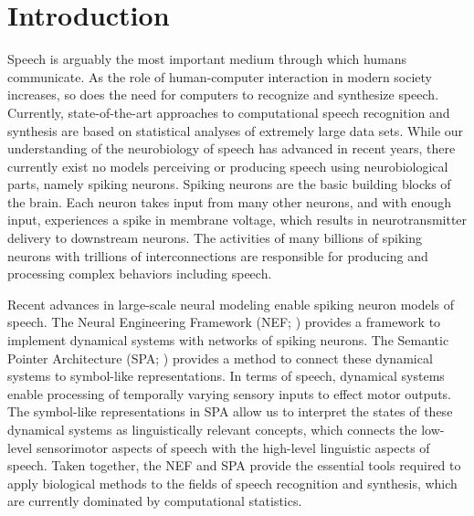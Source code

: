 \chapter{Introduction}

Speech is arguably the most important
medium through which humans communicate.
As the role of human-computer interaction
in modern society increases,
so does the need for computers
to recognize and synthesize speech.
Currently, state-of-the-art approaches
to computational
speech recognition and synthesis
are based on statistical analyses
of extremely large data sets.
While our understanding
of the neurobiology of speech has advanced
in recent years,
there currently exist no
models perceiving or producing speech
using neurobiological parts,
namely spiking neurons.
Spiking neurons are the basic building blocks
of the brain.
Each neuron takes input from many other neurons,
and with enough input,
experiences a spike in membrane voltage,
which results in neurotransmitter
delivery to downstream neurons.
The activities of many billions
of spiking neurons with trillions
of interconnections are responsible
for producing and processing
complex behaviors including speech.

Recent advances in large-scale neural modeling
enable spiking neuron models of speech.
The Neural Engineering Framework (NEF; \cite{eliasmith2004})
provides a framework to implement
dynamical systems with networks of spiking neurons.
The Semantic Pointer Architecture (SPA; \cite{eliasmith2013})
provides a method to connect these dynamical systems
to symbol-like representations.
In terms of speech,
dynamical systems enable processing of
temporally varying sensory inputs
to effect motor outputs.
The symbol-like representations in SPA
allow us to interpret the states
of these dynamical systems
as linguistically relevant concepts,
which connects the low-level
sensorimotor aspects of speech
with the high-level linguistic aspects of speech.
Taken together, the NEF and SPA
provide the essential tools required
to apply biological methods
to the fields of
speech recognition and synthesis,
which are currently dominated
by computational statistics.

